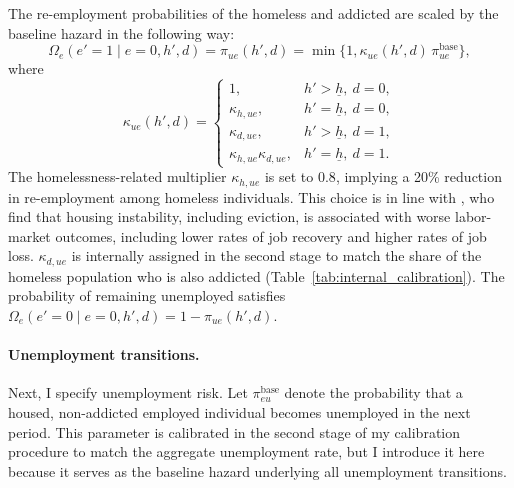 \documentclass[parskip=full]{article}
\theoremstyle{plain}
\theoremstyle{definition}
\theoremstyle{remark}
\begin{document}
The re-employment probabilities of the homeless and addicted are scaled by the baseline hazard in the following way:
\begin{equation*}
\Omega_e(e'=1 \mid e=0, h', d)=\pi_{ue}(h',d)=
\min\{1,\kappa_{ue}(h',d)\,\pi_{ue}^{\text{base}}\},
\label{eq:jobfinding}
\end{equation*}
where
\begin{equation*}
\kappa_{ue}(h',d)=
\begin{cases}
1, & h'>\underline h,\ d=0,\\
\kappa_{h,ue}, & h'=\underline h,\ d=0,\\
\kappa_{d,ue}, & h'>\underline h,\ d=1,\\
\kappa_{h,ue}\kappa_{d,ue}, & h'=\underline h,\ d=1.
\end{cases}
\label{eq:kappa_ue}
\end{equation*}
The homelessness-related multiplier $\kappa_{h,ue}$ is set to $0.8$, implying a 20\% reduction in re-employment among homeless individuals. This choice is in line with \citet{desmond_gershenson_2016}, who find that housing instability, including eviction, is associated with worse labor-market outcomes, including lower rates of job recovery and higher rates of job loss. $\kappa_{d,ue}$ is internally assigned in the second stage to match the share of the homeless population who is also addicted (Table~\ref{tab:internal_calibration}). The probability of remaining unemployed satisfies $\Omega_e(e'=0\mid e=0,h',d)=1-\pi_{ue}(h',d)$.

\paragraph{Unemployment transitions.}
Next, I specify unemployment risk. Let $\pi_{eu}^{\text{base}}$ denote the probability that a housed, non-addicted employed individual becomes unemployed in the next period. This parameter is calibrated in the second stage of my calibration procedure to match the aggregate unemployment rate, but I introduce it here because it serves as the baseline hazard underlying all unemployment transitions.
\end{document}
